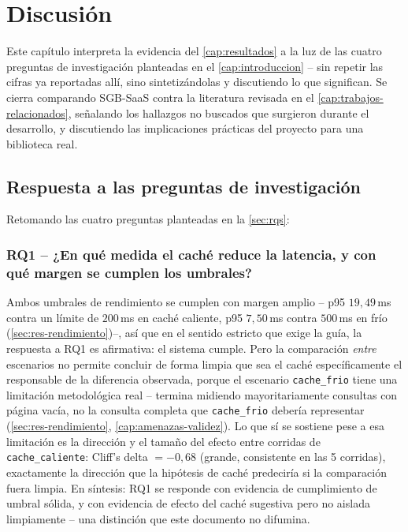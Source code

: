 \chapter{Discusión}
\label{cap:discusion}

Este capítulo interpreta la evidencia del \autoref{cap:resultados} a la
luz de las cuatro preguntas de investigación planteadas en el
\autoref{cap:introduccion} -- sin repetir las cifras ya reportadas allí,
sino sintetizándolas y discutiendo lo que significan. Se cierra
comparando SGB-SaaS contra la literatura revisada en el
\autoref{cap:trabajos-relacionados}, señalando los hallazgos no buscados
que surgieron durante el desarrollo, y discutiendo las implicaciones
prácticas del proyecto para una biblioteca real.

\section{Respuesta a las preguntas de investigación}
\label{sec:disc-rqs}

Retomando las cuatro preguntas planteadas en la
\autoref{sec:rqs}:

\subsection*{RQ1 -- ¿En qué medida el caché reduce la latencia, y con qué margen se cumplen los umbrales?}

Ambos umbrales de rendimiento se cumplen con margen amplio -- p95
$19{,}49$\,ms contra un límite de $200$\,ms en caché caliente, p95
$7{,}50$\,ms contra $500$\,ms en frío
(\autoref{sec:res-rendimiento})--, así que en el sentido estricto que
exige la guía, la respuesta a RQ1 es afirmativa: el sistema cumple. Pero
la comparación \emph{entre} escenarios no permite concluir de forma
limpia que sea el caché específicamente el responsable de la diferencia
observada, porque el escenario \texttt{cache\_frio} tiene una limitación
metodológica real -- termina midiendo mayoritariamente consultas con
página vacía, no la consulta completa que \texttt{cache\_frio} debería
representar (\autoref{sec:res-rendimiento},
\autoref{cap:amenazas-validez}). Lo que sí se sostiene pese a esa
limitación es la dirección y el tamaño del efecto entre corridas de
\texttt{cache\_caliente}: Cliff's delta $=-0{,}68$ (grande, consistente en
las 5 corridas), exactamente la dirección que la hipótesis de caché
predeciría si la comparación fuera limpia. En síntesis: RQ1 se responde
con evidencia de cumplimiento de umbral sólida, y con evidencia de efecto
del caché sugestiva pero no aislada limpiamente -- una distinción que
este documento no difumina.

